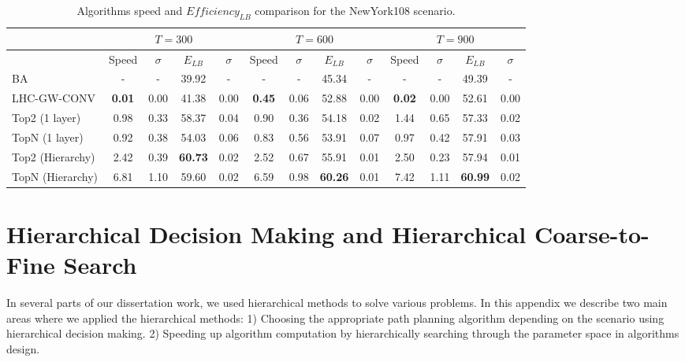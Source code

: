 \begin{center}
\begin{table*}[hbtp]
{
\scriptsize
\hfill{}
\setlength{\extrarowheight}{1.5pt}
\begin{tabular}
{|l|c|c|c|c|c|c|c|c|c|c|c|c|}
\hline
& \multicolumn{4}{|c|}{$T=300$} & \multicolumn{4}{|c|}{$T=600$} & \multicolumn{4}{|c|}{$T=900$} \\ 
\hline
& Speed & $\sigma$ & $\mathit{E_{LB}}$ & $\sigma$ & Speed & $\sigma$ & $\mathit{E_{LB}}$ & $\sigma$ & Speed & $\sigma$ & $\mathit{E_{LB}}$ & $\sigma$\\ 
\hline
BA & - & - & 39.92 & - & - & - & 45.34 & - & - & - & 49.39 & -\\ 
\hline
LHC-GW-CONV & \textbf{0.01} & 0.00 & 41.38 & 0.00 & \textbf{0.45} & 0.06 & 52.88 & 0.00 & \textbf{0.02} & 0.00 & 52.61 & 0.00\\ 
\hline
Top2 (1 layer) & 0.98 & 0.33 & 58.37 & 0.04 & 0.90 & 0.36 & 54.18 & 0.02 & 1.44 & 0.65 & 57.33 & 0.02\\ 
\hline
TopN (1 layer) & 0.92 & 0.38 & 54.03 & 0.06 & 0.83 & 0.56 & 53.91 & 0.07 & 0.97 & 0.42 & 57.91 & 0.03\\ 
\hline
Top2 (Hierarchy) & 2.42 & 0.39 & \textbf{60.73} & 0.02 & 2.52 & 0.67 & 55.91 & 0.01 & 2.50 & 0.23 & 57.94 & 0.01\\ 
\hline
TopN (Hierarchy) & 6.81 & 1.10 & 59.60 & 0.02 & 6.59 & 0.98 & \textbf{60.26} & 0.01 & 7.42 & 1.11 & \textbf{60.99} & 0.02\\ 
\hline
\end{tabular}}
\medskip
\caption{Algorithms speed and $\mathit{Efficiency_{LB}}$ comparison for the NewYork108 scenario.}
\label{NewYork108Table}
\vspace*{-5ex}
\end{table*}
\end{center}


\chapter{Hierarchical Decision Making and Hierarchical Coarse-to-Fine Search}
\label{chap:hierarchical}

In several parts of our dissertation work, we used hierarchical methods to solve various problems. In this appendix we describe two main areas where we applied the hierarchical methods: 1) Choosing the appropriate path planning algorithm depending on the scenario using hierarchical decision making. 2) Speeding up algorithm computation by hierarchically searching through the parameter space in algorithms design.

